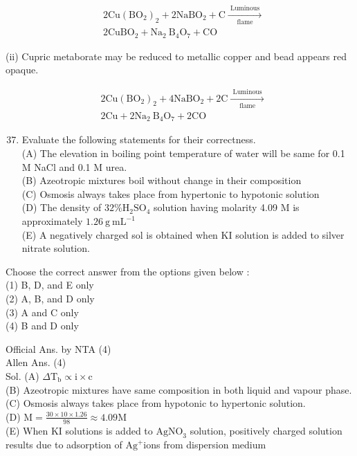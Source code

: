 \documentclass[10pt]{article}
\begin{document}
\[
\begin{aligned}
& 2 \mathrm{Cu}\left(\mathrm{BO}_{2}\right)_{2}+2 \mathrm{NaBO}_{2}+\mathrm{C} \xrightarrow[\text { flame }]{\text { Luminous }} \\
& 2 \mathrm{CuBO}_{2}+\mathrm{Na}_{2} \mathrm{~B}_{4} \mathrm{O}_{7}+\mathrm{CO}
\end{aligned}
\]

(ii) Cupric metaborate may be reduced to metallic copper and bead appears red opaque.

\[
\begin{aligned}
& 2 \mathrm{Cu}\left(\mathrm{BO}_{2}\right)_{2}+4 \mathrm{NaBO}_{2}+2 \mathrm{C} \xrightarrow[\text { flame }]{\text { Luminous }} \\
& 2 \mathrm{Cu}+2 \mathrm{Na}_{2} \mathrm{~B}_{4} \mathrm{O}_{7}+2 \mathrm{CO}
\end{aligned}
\]

\begin{enumerate}
  \setcounter{enumi}{36}
  \item Evaluate the following statements for their correctness.\\
(A) The elevation in boiling point temperature of water will be same for 0.1 M NaCl and 0.1 M urea.\\
(B) Azeotropic mixtures boil without change in their composition\\
(C) Osmosis always takes place from hypertonic to hypotonic solution\\
(D) The density of \(32 \% \mathrm{H}_{2} \mathrm{SO}_{4}\) solution having molarity 4.09 M is approximately \(1.26 \mathrm{~g} \mathrm{~mL}^{-1}\)\\
(E) A negatively charged sol is obtained when KI solution is added to silver nitrate solution.
\end{enumerate}

Choose the correct answer from the options given below :\\
(1) B, D, and E only\\
(2) A, B, and D only\\
(3) A and C only\\
(4) B and D only

Official Ans. by NTA (4)\\
Allen Ans. (4)\\
Sol. (A) \(\Delta \mathrm{T}_{\mathrm{b}} \propto \mathrm{i} \times \mathrm{c}\)\\
(B) Azeotropic mixtures have same composition in both liquid and vapour phase.\\
(C) Osmosis always takes place from hypotonic to hypertonic solution.\\
(D) \(\mathrm{M}=\frac{30 \times 10 \times 1.26}{98} \approx 4.09 \mathrm{M}\)\\
(E) When KI solutions is added to \(\mathrm{AgNO}_{3}\) solution, positively charged solution results due to adsorption of \(\mathrm{Ag}^{+}\)ions from dispersion medium
\end{document}
